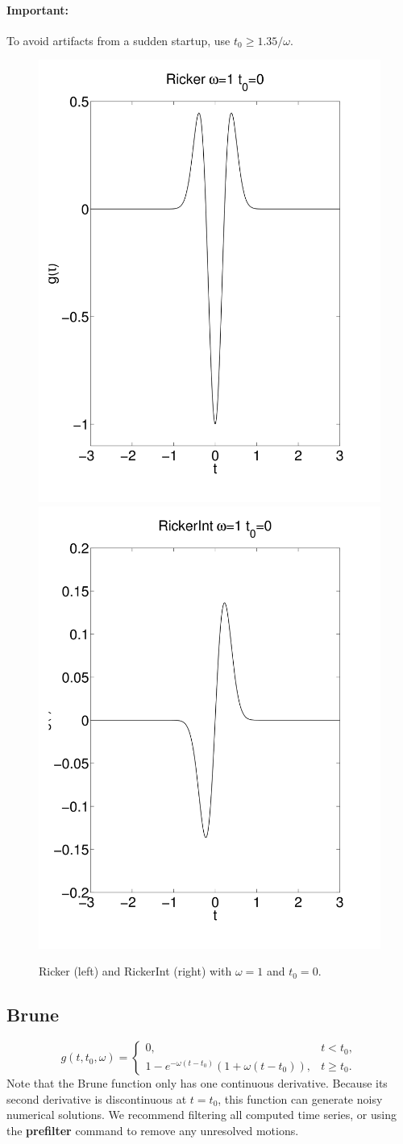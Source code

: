 \documentclass[11pt]{report}
\begin{document}
\paragraph{Important:} To avoid artifacts from a sudden startup, use
$t_0 \geq 1.35/\omega$.
\begin{figure}
\begin{centering}
  \includegraphics[width=0.4\linewidth]{f3-ricker.png}
  \includegraphics[width=0.4\linewidth]{f4-rickerint.png}
  \caption{Ricker (left) and RickerInt (right) with $\omega=1$ and $t_0=0$.}
  \label{fig:rickers}
\end{centering}
\end{figure}  
%
\subsection{Brune} 
 \label{brune}
\[
 g(t,t_0,\omega) = \left\{
\begin{array}{ll} 
0, & t < t_0, \\ 
1 - e^{-\omega(t-t_0)}( 1+\omega(t-t_0) ), & t \geq t_0.
\end{array}
\right.
\]
Note that the Brune function only has one continuous derivative. Because its second derivative is discontinuous at
$t=t_0$, this function can generate noisy numerical solutions. We recommend filtering all computed time
series, or using the {\bf prefilter} command to remove any unresolved motions.
\end{document}
